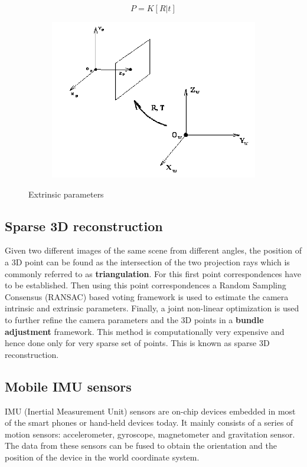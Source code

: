 \documentclass{article}
\begin{document}
				\begin{equation}
				P = K[R|t]
				\end{equation}
						\begin{figure}[ht!]
			\centering
			\begin{subfigure}{.5\textwidth}
			  	\centering
			  	\includegraphics[width=1.0\linewidth]{img317.png}
			  	\label{fig:sub1}
			\end{subfigure}%
			\caption{Extrinsic parameters}
			\label{figstart}
		\end{figure}
			
			\subsection{Sparse 3D reconstruction} 
				Given two different images of the same scene from different angles, the position of a 3D point can be found as the intersection of the two projection rays which is commonly referred to as \textbf{triangulation}. For this first point correspondences have to be established. Then using this point correspondences a Random Sampling Consensus (RANSAC) based voting framework is used to estimate the camera intrinsic and extrinsic parameters. Finally, a joint non-linear optimization is used to further refine the camera parameters and the 3D points in a \textbf{bundle adjustment} framework. This method is computationally very expensive and hence done only for very sparse set of points. This is known as sparse 3D reconstruction.

			\subsection{Mobile IMU sensors}
				IMU (Inertial Measurement Unit) sensors are on-chip devices embedded in most of the smart phones or hand-held devices today. It mainly consists of a series of motion sensors: accelerometer, gyroscope, magnetometer and gravitation sensor. The data from these sensors can be fused to obtain the orientation and the position of the device in the world coordinate system.
\end{document}
